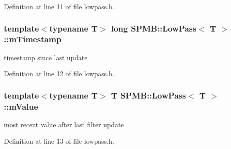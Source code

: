 Definition at line 11 of file lowpass.\+h.

\subsubsection[{\texorpdfstring{m\+Timestamp}{mTimestamp}}]{\setlength{\rightskip}{0pt plus 5cm}template$<$typename T$>$ long {\bf S\+P\+M\+B\+::\+Low\+Pass}$<$ T $>$\+::m\+Timestamp}\hypertarget{classSPMB_1_1LowPass_a0d65cef27970b458eb9a8065e3141eae}{}\label{classSPMB_1_1LowPass_a0d65cef27970b458eb9a8065e3141eae}
timestamp since last update 

Definition at line 12 of file lowpass.\+h.

\subsubsection[{\texorpdfstring{m\+Value}{mValue}}]{\setlength{\rightskip}{0pt plus 5cm}template$<$typename T$>$ T {\bf S\+P\+M\+B\+::\+Low\+Pass}$<$ T $>$\+::m\+Value}\hypertarget{classSPMB_1_1LowPass_a63f1e9ef7ccb4a1b51ebb81681d377ec}{}\label{classSPMB_1_1LowPass_a63f1e9ef7ccb4a1b51ebb81681d377ec}
most recent value after last filter update 

Definition at line 13 of file lowpass.\+h.

